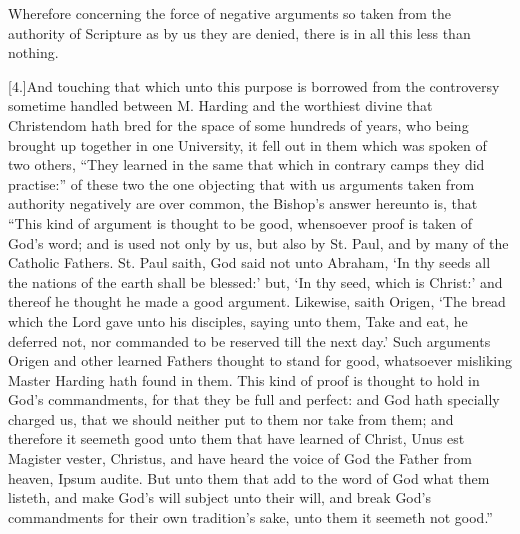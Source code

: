 Wherefore concerning the force of negative arguments so taken from the authority of Scripture as by us they are denied, there is in all this less than nothing.

[4.]And touching that which unto this purpose is borrowed from the controversy sometime handled between M. Harding  and the worthiest divine that Christendom hath bred for the space of some hundreds of years, who being brought up together in one University, it fell out in them which was spoken of two others, “They learned in the same that which in contrary camps they did practise:” of these two the one objecting that with us arguments taken from authority negatively are over common, the Bishop’s answer hereunto is, that “This kind of argument is thought to be good, whensoever proof is taken of God’s word; and is used not only by us, but also by St. Paul, and by many of the Catholic Fathers. St. Paul saith, God said not unto Abraham, ‘In thy seeds all the nations of the earth shall be blessed:’ but, ‘In thy seed, which is Christ:’ and thereof he thought he made a good argument. Likewise, saith Origen, ‘The bread which the Lord gave unto his disciples, saying unto  them, Take and eat, he deferred not, nor commanded to be reserved till the next day.’ Such arguments Origen and other learned Fathers thought to stand for good, whatsoever misliking Master Harding hath found in them. This kind of proof is thought to hold in God’s commandments, for that they be full and perfect: and God hath specially charged us, that we should neither put to them nor take from them; and therefore it seemeth good unto them that have learned of Christ, Unus est Magister vester, Christus, and have heard the voice of God the Father from heaven, Ipsum audite. But unto them that add to the word of God what them listeth, and make God’s will subject unto their will, and break God’s commandments for their own tradition’s sake, unto them it seemeth not good.”

